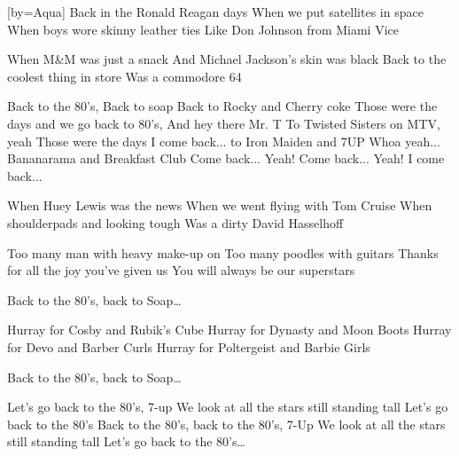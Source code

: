 [by={Aqua}]
\beginverse
Back in the Ronald Reagan days
When we put satellites in space
When boys wore skinny leather ties
Like Don Johnson from Miami Vice
\endverse

\beginverse
When M\&M was just a snack
And Michael Jackson's skin was black
Back to the coolest thing in store
Was a commodore 64
\endverse


\beginchorus
Back to the 80's,
Back to soap
Back to Rocky and Cherry coke
Those were the days and we go back to 80's,
And hey there Mr. T
To Twisted Sisters on MTV, yeah
Those were the days
I come back... to Iron Maiden and 7UP
Whoa yeah... Bananarama and Breakfast Club
Come back... Yeah!
Come back... Yeah!
I come back...
\endchorus

\beginverse
When Huey Lewis was the news
When we went flying with Tom Cruise
When shoulderpads and looking tough
Was a dirty David Hasselhoff
\endverse

\beginverse
Too many man with heavy make-up on
Too many poodles with guitars
Thanks for all the joy you've given us
You will always be our superstars
\endverse

\beginchorus
Back to the 80's, back to Soap\dots
\endchorus

\beginverse
Hurray for Cosby and Rubik's Cube
Hurray for Dynasty and Moon Boots
Hurray for Devo and Barber Curls
Hurray for Poltergeist and Barbie Girls
\endverse

\beginchorus
Back to the 80's, back to Soap\dots
\endchorus

\beginverse
Let's go back to the 80's, 7-up
We look at all the stars still standing tall
Let's go back to the 80's
Back to the 80's, back to the 80's, 7-Up
We look at all the stars still standing tall
Let's go back to the 80's\dots
\endverse
\endsong